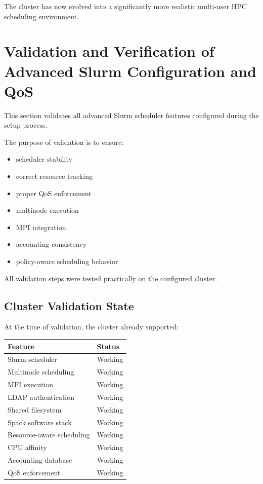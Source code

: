 \documentclass[11pt]{article}
\begin{document}
The cluster has now evolved into a significantly more realistic
multi-user HPC scheduling environment.
\section{Validation and Verification of Advanced Slurm Configuration and QoS}
\label{sec:org0835044}

This section validates all advanced Slurm scheduler features configured
during the setup process.

The purpose of validation is to ensure:

\begin{itemize}
\item scheduler stability
\item correct resource tracking
\item proper QoS enforcement
\item multinode execution
\item MPI integration
\item accounting consistency
\item policy-aware scheduling behavior
\end{itemize}

All validation steps were tested practically on the configured cluster.
\subsection{Cluster Validation State}
\label{sec:orgaaa5cd3}

At the time of validation, the cluster already supported:

\begin{center}
\begin{tabular}{ll}
Feature & Status\\
\hline
Slurm scheduler & Working\\
Multinode scheduling & Working\\
MPI execution & Working\\
LDAP authentication & Working\\
Shared filesystem & Working\\
Spack software stack & Working\\
Resource-aware scheduling & Working\\
CPU affinity & Working\\
Accounting database & Working\\
QoS enforcement & Working\\
\end{tabular}
\end{center}
\end{document}
